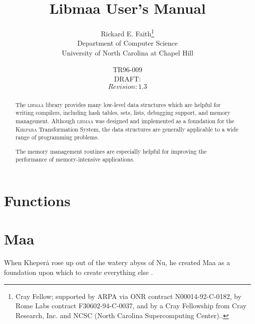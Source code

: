 \documentclass[draft]{article}
\newcommand{\libmaa}{\textsc{libmaa}\xspace}
\newcommand{\kheperalong}{\textsc{Khepera} Transformation System\xspace}
\newcommand{\Khepera}{Kheper\.a\xspace}
\newcommand{\Maa}{Maa\xspace}
\begin{document}
 \title{Libmaa User's Manual}

\author{Rickard E. Faith\thanks{Cray Fellow; supported by ARPA via ONR
    contract N00014-92-C-0182, by Rome Labs contract F30602-94-C-0037, and
    by a Cray Fellowship from Cray Research, Inc. and NCSC (North Carolina
    Supercomputing Center)..}
  \\ Department of Computer Science
  \\ University of North Carolina at Chapel Hill}
\date{TR96-009 \\ DRAFT: \FileRevised \\ $Revision: 1.3 $}

\maketitle\tableofcontents

\clearpage

\begin{abstract}
  The \libmaa library provides many low-level data structures which are
  helpful for writing compilers, including hash tables, sets, lists,
  debugging support, and memory management.  Although \libmaa was designed
  and implemented as a foundation for the \kheperalong, the data structures
  are generally applicable to a wide range of programming problems.

  The memory management routines are especially helpful for improving the
  performance of memory-intensive applications.
\end{abstract}

\clearpage
\section{Functions}


\clearpage
\appendix

\section{\Maa}

When \Khepera rose up out of the watery abyss of Nu, he created \Maa as a
foundation upon which to create everything else
\cite[pp.~295--8]{faith:Budge04b}.


\end{document}
